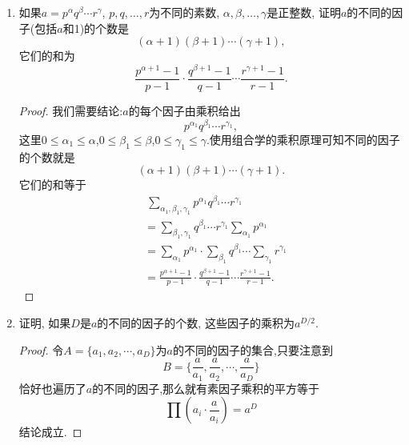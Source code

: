\documentclass[12pt,a4paper]{book} %
\theoremstyle{remark}
\theoremstyle{example}
\theoremstyle{lemma}
\theoremstyle{corollary}
\numberwithin{theorem}{chapter}
\begin{document}
\begin{enumerate}
\begin{proof}
这里需要一个结论:
\[
(a,b) = (a - kb,b),
\]
$m \neq n$,我们不妨设$m>n$,那么根据提示有
\[
(a^{2^m}+1, a^{2^n}+1)=(a^{2^m}+1-(a^{2^m}-1), a^{2^n}+1)=(2, a^{2^n}+1),
\]
当$a$为偶数的时候,$a^{2^n}+1$为奇数,最大公约数为1,否则为偶数,最大公约数等于2.

后一个结论可以这样来证明:我们直接取$a=2$,那么序列
\[
\{2^{2^n}+1\}
\]
任意两个数都是互素的.那么他们的素因子也是互不相同的,因此素数必然有无限多个.
\end{proof}

\item 如果$a = p^{\alpha}q^{\beta} \cdots r^{\gamma}$, $p, q, \ldots, r$为不同的素数, $\alpha, \beta, \ldots, \gamma$是正整数, 证明$a$的不同的因子(包括$a$和1)的个数是
\[
(\alpha + 1)(\beta + 1) \cdots (\gamma + 1),
\]
它们的和为
\[
\frac{p^{\alpha + 1} - 1}{p - 1} \cdot \frac{q^{\beta + 1} - 1}{q - 1} \cdots \frac{r^{\gamma + 1} - 1}{r - 1}.
\]

\begin{proof}
我们需要结论:$a$的每个因子由乘积给出
\[
p^{\alpha_1}q^{\beta_1} \cdots r^{\gamma_1},
\]
这里$0 \le \alpha_1 \le \alpha$,$0 \le \beta_1 \le \beta$,$0 \le \gamma_1 \le \gamma$.使用组合学的乘积原理可知不同的因子的个数就是
\[
(\alpha + 1)(\beta + 1) \cdots (\gamma + 1).
\]
它们的和等于
\[
\begin{aligned}
&\ \sum_{\alpha_1,\beta_1,\gamma_1}{p^{\alpha_1}q^{\beta_1} \cdots r^{\gamma_1}} \\
&= \sum_{\beta_1,\gamma_1}{q^{\beta_1} \cdots r^{\gamma_1} \sum_{\alpha_1}{p^{\alpha_1}}} \\
&= \sum_{\alpha_1}{p^{\alpha_1}} \cdot \sum_{\beta_1}{q^{\beta_1}} \cdots \sum_{\gamma_1}{r^{\gamma_1}} \\
&= \frac{p^{\alpha + 1} - 1}{p - 1} \cdot \frac{q^{\beta + 1} - 1}{q - 1} \cdots \frac{r^{\gamma + 1} - 1}{r - 1}.
\end{aligned}
\]
\end{proof}

\item 证明, 如果$D$是$a$的不同的因子的个数, 这些因子的乘积为$a^{D/2}$.

\begin{proof}
令$A = \{a_1,a_2,\cdots,a_D\}$为$a$的不同的因子的集合,只要注意到
\[
B=\{\frac{a}{a_1},\frac{a}{a_2},\cdots,\frac{a}{a_D}\}
\]
恰好也遍历了$a$的不同的因子,那么就有素因子乘积的平方等于
\[
\prod{(a_i \cdot \frac{a}{a_i})} = a^D
\]
结论成立.
\end{proof}


\end{enumerate}
\end{document}
